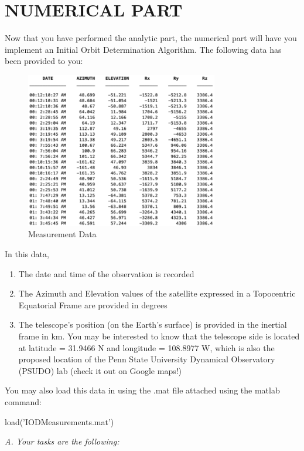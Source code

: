 \documentclass[12pt, letterpaper]{aiaa-tc}
\begin{document}
\section{NUMERICAL PART}
Now that you have performed the analytic part, the numerical part will have you implement an Initial Orbit
Determination Algorithm. The following data has been provided to you:

\begin{figure}[h]
    \centering
    \includegraphics[width=0.75\textwidth]{num_data}
    \caption{Measurement Data}
    \label{fig:num_data}
\end{figure}

In this data,
\begin{enumerate}
    \item The date and time of the observation is recorded
    \item The Azimuth and Elevation values of the satellite expressed in a Topocentric Equatorial Frame are provided
    in degrees
    \item The telescope's position (on the Earth's surface) is provided in the inertial frame in km. You may be interested
    to know that the telescope side is located at latitude = 31.9466 N and longitude = 108.8977 W, which is
    also the proposed location of the Penn State University Dynamical Observatory (PSUDO) lab (check it out
    on Google maps!)
\end{enumerate}
You may also load this data in using the .mat file attached using the matlab command:

\quad load('IODMeasurements.mat')

\raggedright \textit{A. Your tasks are the following:}
\end{document}
